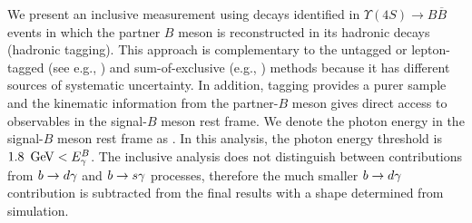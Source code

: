We present an inclusive measurement using \BtoXsgamma decays identified in $\Upsilon(4S) \to B\overline{B}$ events in which the partner $B$ meson is reconstructed in its hadronic decays (hadronic tagging). This approach is complementary to the untagged or lepton-tagged (see e.g., \cite{BaBar:2012fqh}) and sum-of-exclusive (e.g., \cite{Belle:2014nmp}) methods because it has different sources of systematic uncertainty. In addition, tagging provides a purer sample and the kinematic information from the partner-$B$ meson gives direct access to observables in the signal-$B$ meson rest frame. We denote the photon energy in the signal-$B$ meson rest frame as \EB. In this analysis, the photon energy threshold is $1.8~\mathrm{\,Ge\kern -0.1em V}<{E^B_{\gamma}}$. The inclusive analysis does not distinguish between contributions from $b\rightarrow d\gamma$ and $b\rightarrow s\gamma$ processes, therefore the much smaller $b\rightarrow d\gamma$ contribution is subtracted from the final results with a shape determined from simulation.








